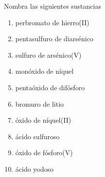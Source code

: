 \documentclass[10pt,a5paper,twoside]{article}
\begin{document}
\begin{exercise}[
    tags    = {inorgánica,formulación,múltiple,2B},
    topics  = {química inorgánica,formulación,nomenclatura},
    source  = {Química 2B SAN 2016, p372, e13},
  ]
  Nombra las siguientes sustancias

  \begin{enumerate}
    \item perbromato de hierro(II)
    \item pentasulfuro de diarsénico
    \item sulfuro de arsénico(V)
    \item monóxido de níquel
    \item pentaóxido de difósforo
    \item bromuro de litio
    \item óxido de níquel(II)
    \item ácido sulfuroso
    \item óxido de fósforo(V)
    \item ácido yodoso
  \end{enumerate}
\end{exercise}

\begin{solution}
  \begin{enumerate}\begin{multicols}{2}
    \item {}
    \item {}
    \item {}
    \item {}
    \item {}
    \item {}
    \item {}
    \item {}
    \item {}
    \item {}
  \end{multicols}\end{enumerate}
\end{solution}
\end{document}
